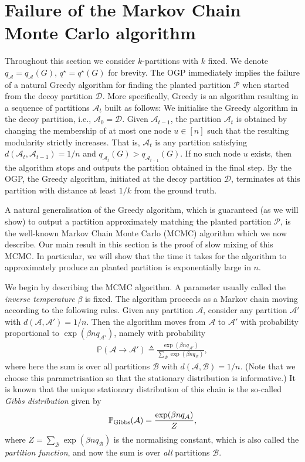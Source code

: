 \documentclass[a4paper,UKenglish,cleveref, autoref, thm-restate,numberwithinsect]{lipics-v2021}
\newcommand{\pr}{{\mathbb P}}
\newcommand{\cA}{\mathcal{A}}
\newcommand{\cD}{\mathcal{D}}
\begin{document}
\section{Failure of the Markov Chain Monte Carlo algorithm}\label{subsection:slow-mixing}\label{sec:slow-mixing}
Throughout this section we consider $k$-partitions with $k$ fixed.  We denote $q_{\cA}=q_{\cA}(G)$, $q^{\star}=q^{\star}(G)$ for brevity.
The OGP immediately implies the failure of a natural Greedy algorithm for finding the planted partition $\mathcal{P}$ when 
started from the decoy partition $\mathcal{D}$. More specifically, Greedy is an algorithm resulting in a sequence of partitions $\mathcal{A}_t$ built
as follows: We initialise the Greedy algorithm in the decoy partition, i.e., $\mathcal{A}_0=\mathcal{D}$. Given $\mathcal{A}_{t-1}$, the partition $\mathcal{A}_t$ is obtained 
by changing the membership of at most one node $u\in [n]$ such that the resulting modularity strictly increases. 
That is, $\cA_t$ is any partition satisfying
$d(\cA_t, \cA_{t-1})={ 1/n}$ and 
$q_{\mathcal{A}_t}(G)>q_{\mathcal{A}_{t-1}}(G)$. If no such node $u$ exists, then the algorithm stops and outputs the partition obtained
in the final step. By the OGP, the Greedy algorithm, initiated at the decoy partition $\cD$, terminates at this partition with distance at least $1/k$ from the ground truth.

A natural generalisation of the Greedy algorithm, which is guaranteed (as we will show) to output a partition approximately
matching the planted partition $\mathcal{P}$, is the well-known  Markov Chain Monte Carlo (MCMC) algorithm which we now describe. 
Our main result in this section is the proof of slow mixing of this MCMC. In particular, we will show that the time it takes for the algorithm to approximately produce an 
planted partition is exponentially large in $n$. 

We begin by describing the MCMC algorithm. A parameter usually called the {\em inverse temperature} $\beta$ is fixed. The algorithm proceeds as a Markov 
chain moving according to the following rules. Given any partition $\mathcal{A}$, consider any partition $\mathcal{A}'$ with 
$d(\mathcal{A},\mathcal{A}')={ 1/n}$. Then the algorithm moves from $\mathcal{A}$ to $\mathcal{A}'$ with probability proportional
to $\exp(\beta n q_{\mathcal{A}'})$, namely with probability
%
%
%
\begin{align*}
\pr\left(\mathcal{A}\to \mathcal{A}'\right) \triangleq \frac{ \exp(\beta n q_{\mathcal{A}'}) } {\sum_{\mathcal{B}} \exp(\beta n q_{\mathcal{B}})},
\end{align*}
where here the sum is over all partitions $\mathcal{B}$ with $d(\mathcal{A},\mathcal{B})={1/n}$. (Note that we choose this parametrisation so that the stationary distribution is informative.) 
It is known that the unique stationary 
distribution of this chain is the so-called \emph{Gibbs distribution} given by 
\begin{align*}
\pr_{\rm Gibbs}(\mathcal{A})=\frac{\exp(\beta n q_{\mathcal{A}})}{Z},
\end{align*}
where $Z=\sum_{\mathcal{B}} \exp(\beta n q_{\mathcal{B}})$ is the normalising constant, which is also called the {\em partition function}, and now the sum is over \emph{all} partitions $\mathcal{B}$.
\end{document}
